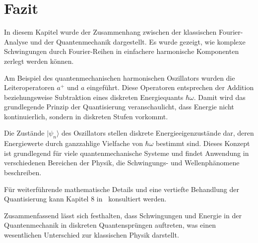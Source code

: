 \section{Fazit\label{fourier:section:fazit}}
In diesem Kapitel wurde der Zusammenhang zwischen der klassischen Fourier-Analyse und der Quantenmechanik dargestellt.
Es wurde gezeigt, wie komplexe Schwingungen durch Fourier-Reihen in einfachere harmonische Komponenten zerlegt werden können.

Am Beispiel des quantenmechanischen harmonischen Oszillators wurden die Leiteroperatoren $a^+$ und $a$ eingeführt.
Diese Operatoren entsprechen der Addition beziehungsweise Subtraktion eines diskreten Energiequants $\hbar \omega$.
Damit wird das grundlegende Prinzip der Quantisierung veranschaulicht, dass Energie nicht kontinuierlich, sondern in diskreten Stufen vorkommt.

Die Zustände $|\psi_n\rangle$ des Oszillators stellen diskrete Energieeigenzustände dar, deren Energiewerte durch ganzzahlige Vielfache von $\hbar \omega$ bestimmt sind.
Dieses Konzept ist grundlegend für viele quantenmechanische Systeme und findet Anwendung in verschiedenen Bereichen der Physik, die Schwingungs- und Wellenphänomene beschreiben.

Für weiterführende mathematische Details und eine vertiefte Behandlung der Quantisierung kann Kapitel 8 in~\cite{fourier:quantenmechanik} konsultiert werden.

Zusammenfassend lässt sich festhalten, dass Schwingungen und Energie in der Quantenmechanik in diskreten Quantensprüngen auftreten, was einen wesentlichen Unterschied zur klassischen Physik darstellt.

